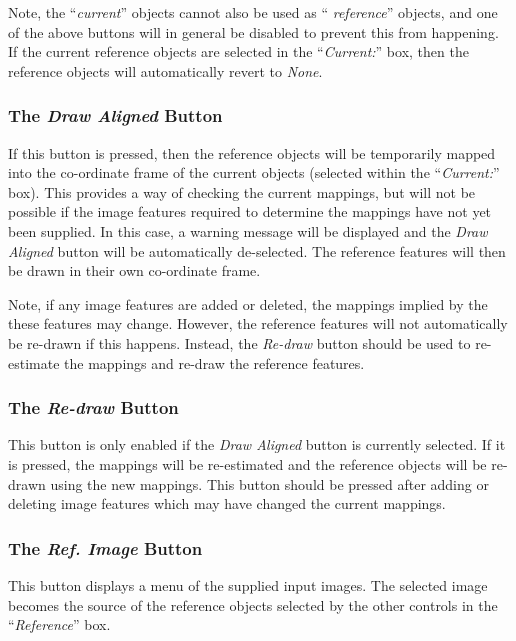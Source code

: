 \documentclass[11pt]{article}
\newcommand{\htmlref}[2]{#1}
\newcommand{\xlabel}[1]{}
\newcommand{\mylabel}[1] {\xlabel{#1}\label{#1}}
\begin{document}
Note, the ``\emph{current}'' objects cannot also be used as ``{\em
reference}'' objects, and one of the above buttons will in general be
disabled to prevent this from happening. If the current reference objects are
selected in the ``\htmlref{\emph{Current:}}{POLKA_CURRENT}'' box, then the
reference objects will automatically revert to \emph{None}.

\subsubsection {\mylabel{POLKA_DRAW_ALIGNED}The \emph{Draw Aligned} Button}
If this button is pressed, then the reference objects will be temporarily
mapped into the co-ordinate frame of the current objects (selected within
the ``\htmlref{\emph{Current:}}{POLKA_CURRENT}'' box). This provides a
way of checking the current mappings, but will not be possible if the
image features required to determine the mappings have not yet been
supplied. In this case, a warning message will be displayed and the {\em
Draw Aligned} button will be automatically de-selected. The reference
features will then be drawn in their own co-ordinate frame.

Note, if any image features are added or deleted, the mappings implied by
the these features may change. However, the reference features will not
automatically be re-drawn if this happens. Instead, the \htmlref{{\em
Re-draw}}{POLKA_REDRAW} button should be used to re-estimate the
mappings and re-draw the reference features.

\subsubsection {\mylabel{POLKA_REDRAW}The \emph{Re-draw} Button}
This button is only enabled if the \htmlref{\emph{Draw
Aligned}}{POLKA_DRAW_ALIGNED} button is currently selected. If it is
pressed, the mappings will be re-estimated and the reference objects will
be re-drawn using the new mappings. This button should be pressed after
adding or deleting image features which may have changed the current
mappings.

\subsubsection {\mylabel{POLKA_REF_IMAGE}The \emph{Ref. Image} Button}
This button displays a menu of the supplied input images. The selected
image becomes the source of the reference objects selected by the other
controls in the ``\emph{Reference}'' box.
\end{document}
